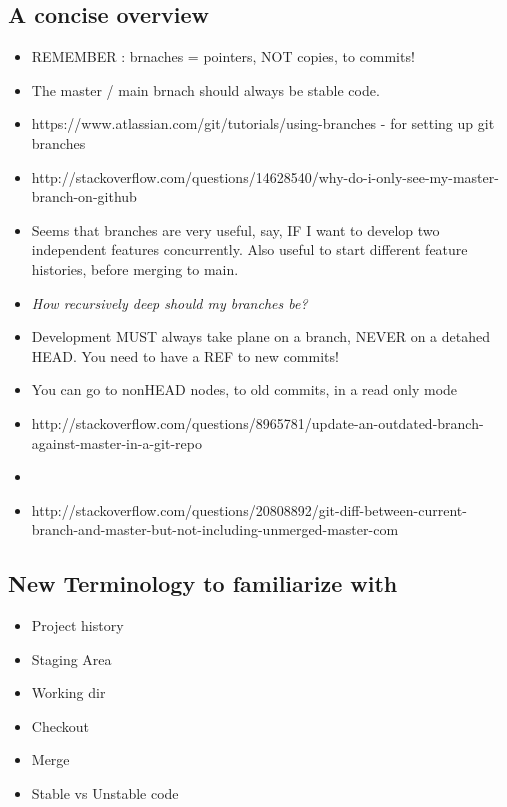 \documentclass{article}
\begin{document}
\subsection{A concise overview}
\begin{itemize}
	\item REMEMBER : brnaches = pointers, NOT copies, to commits!
	\item The master / main brnach should always be stable code.
	\item https://www.atlassian.com/git/tutorials/using-branches - for setting up git branches
	\item http://stackoverflow.com/questions/14628540/why-do-i-only-see-my-master-branch-on-github
	\item Seems that branches are very useful, say, IF I want to develop two independent features concurrently. Also useful to start different feature histories, before merging to main.
	\item \textit{How recursively deep should my branches be?} 
	\item Development MUST always take plane on a branch, NEVER on a detahed HEAD. You need to have a REF to new commits! 
	\item You can go to nonHEAD nodes, to old commits, in a read only mode


	\item http://stackoverflow.com/questions/8965781/update-an-outdated-branch-against-master-in-a-git-repo 
	\item {}
	\item http://stackoverflow.com/questions/20808892/git-diff-between-current-branch-and-master-but-not-including-unmerged-master-com
\end{itemize}

\subsection{New Terminology to familiarize with}
\begin{itemize}
	\item Project history
	\item Staging Area
	\item Working dir
	\item Checkout
	\item Merge
	\item Stable vs Unstable code
\end{itemize}
\end{document}
